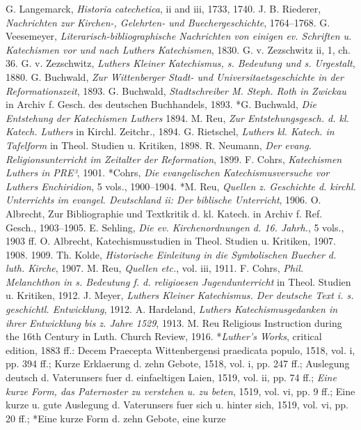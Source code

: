 G. Langemarck, \emph{Historia catechetica}, ii and iii, 1733, 1740. J. B. Riederer, \emph{Nachrichten zur Kirchen-, Gelehrten- und Buecher\-geschichte}, 1764–1768. G. Veesemeyer, \emph{Literarisch-bibliographische Nachrichten von einigen ev. Schriften u. Katechismen vor und nach Luthers Katechismen}, 1830. G. v. Zezschwitz ii, 1, ch. 36. G. v. Zezschwitz, \emph{Luthers Kleiner Katechismus, s. Bedeutung und s. Urgestalt}, 1880. G. Buchwald, \emph{Zur Wittenberger Stadt- und Universitaetsgeschichte in der Reformationszeit}, 1893. G. Buchwald, \emph{Stadtschreiber M. Steph. Roth in Zwickau} in Archiv f. Gesch. des deutschen Buchhandels, 1893. *G. Buchwald, \emph{Die Entstehung der Katechismen Luthers} 1894. M. Reu, \emph{Zur Entstehungsgesch. d. kl. Katech. Luthers} in Kirchl. Zeitchr., 1894. G. Rietschel, \emph{Luthers kl. Katech. in Tafelform} in Theol. Studien u. Kritiken, 1898. R. Neumann, \emph{Der evang. Religionsunterricht im Zeitalter der Reformation}, 1899. F. Cohrs, \emph{Katechismen Luthers in PRE³}, 1901. *Cohrs, \emph{Die evangelischen Katechismusversuche vor Luthers Enchiridion}, 5 vols., 1900–1904. *M. Reu, \emph{Quellen z. Geschichte d. kirchl. Unterrichts im evangel. Deutschland ii: Der biblische Unterricht}, 1906. O. Albrecht, Zur Bibliographie und Textkritik d. kl. Katech. in Archiv f. Ref. Gesch., 1903–1905. E. Sehling, \emph{Die ev. Kirchenordnungen d. 16. Jahrh.}, 5 vols., 1903 ff. O. Albrecht, Katechismusstudien in Theol. Studien u. Kritiken, 1907. 1908. 1909. Th. Kolde, \emph{Historische Einleitung in die Symbolischen Buecher d. luth. Kirche}, 1907. M. Reu, \emph{Quellen etc.}, vol. iii, 1911. F. Cohrs, \emph{Phil. Melanchthon in s. Bedeutung f. d. religioesen Jugendunterricht} in Theol. Studien u. Kritiken, 1912. J. Meyer, \emph{Luthers Kleiner Katechismus. Der deutsche Text i. s. geschichtl. Entwicklung}, 1912. A. Hardeland, \emph{Luthers Katechismusgedanken in ihrer Entwicklung bis z. Jahre 1529}, 1913. M. Reu Religious Instruction during the 16th Century in Luth. Church Review, 1916. *\emph{Luther's Works}, critical edition, 1883 ff.: Decem Praecepta Wittenbergensi praedicata populo, 1518, vol. i, pp. 394 ff.; Kurze Erklaerung d. zehn Gebote, 1518, vol. i, pp. 247 ff.; Auslegung deutsch d. Vaterunsers fuer d. einfaeltigen Laien, 1519, vol. ii, pp. 74 ff.; \emph{Eine kurze Form, das Paternoster zu verstehen u. zu beten}, 1519, vol. vi, pp. 9 ff.; Eine kurze u. gute Auslegung d. Vaterunsers fuer sich u. hinter sich, 1519, vol. vi, pp. 20 ff.; *Eine kurze Form d. zehn Gebote, eine kurze

